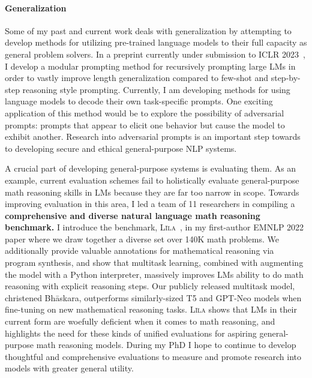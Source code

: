 \documentclass[11pt]{article}
\newcommand\lila{\textsc{L\={\i}la}\xspace}
\begin{document}
\paragraph{Generalization}

Some of my past and current work deals with generalization 
by attempting to develop methods for utilizing pre-trained language models
to their full capacity as general problem solvers.
In a preprint currently under submission to ICLR 2023~\cite{Khot2022DecomposedPA},
I develop a modular prompting method for recursively prompting large LMs 
in order to vastly improve length generalization 
compared to few-shot and step-by-step reasoning style prompting.
Currently, I am developing methods for using language models 
to decode their own task-specific prompts.
One exciting application of this method would be to explore 
the possibility of adversarial prompts: 
prompts that appear to elicit one behavior 
but cause the model to exhibit another.
Research into adversarial prompts 
is an important step towards to developing 
secure and ethical general-purpose NLP systems. 

A crucial part of developing general-purpose systems is evaluating them.
As an example, 
current evaluation schemes fail to holistically evaluate 
general-purpose math reasoning skills in LMs
because they are far too narrow in scope.
Towards improving evaluation in this area, 
I led a team of 11 researchers in compiling a
\textbf{comprehensive and diverse natural language math reasoning benchmark.} 
I introduce the benchmark, \lila~\cite{Mishra2022Lila}, 
in my first-author EMNLP 2022 paper
where we draw together a diverse set over 140K math problems.
We additionally provide valuable annotations for mathematical reasoning via program synthesis, 
and show that multitask learning, 
combined with augmenting the model with a Python interpreter,
massively improves LMs ability to do math reasoning 
with explicit reasoning steps.
Our publicly released multitask model, christened Bh\=askara, 
outperforms similarly-sized T5 and GPT-Neo models
when fine-tuning on new mathematical reasoning tasks.
\lila shows that LMs 
in their current form 
are woefully deficient when it comes to math reasoning,
and highlights the need for these kinds of unified evaluations for 
aspiring general-purpose math reasoning models.
During my PhD I hope to continue to develop thoughtful and comprehensive evaluations 
to measure and promote research into models with greater general utility.
\end{document}
